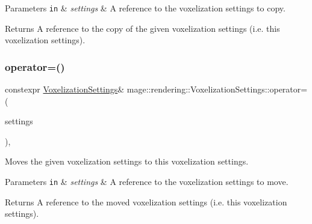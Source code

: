\begin{DoxyParams}[1]{Parameters}
\mbox{\tt in}  & {\em settings} & A reference to the voxelization settings to copy. \\
\hline
\end{DoxyParams}
\begin{DoxyReturn}{Returns}
A reference to the copy of the given voxelization settings (i.\+e. this voxelization settings). 
\end{DoxyReturn}
\mbox{\label{classmage_1_1rendering_1_1_voxelization_settings_a96ea5fa3e2a8bdab0b4835caa11bd13f}} 
\subsubsection{\texorpdfstring{operator=()}{operator=()}\hspace{0.1cm}{\footnotesize\ttfamily [2/2]}}
{\footnotesize\ttfamily constexpr \mbox{\hyperlink{classmage_1_1rendering_1_1_voxelization_settings}{Voxelization\+Settings}}\& mage\+::rendering\+::\+Voxelization\+Settings\+::operator= (\begin{DoxyParamCaption}\item[{\mbox{\hyperlink{classmage_1_1rendering_1_1_voxelization_settings}{Voxelization\+Settings}} \&\&}]{settings }\end{DoxyParamCaption})\hspace{0.3cm}{\ttfamily [default]}, {\ttfamily [noexcept]}}

Moves the given voxelization settings to this voxelization settings.


\begin{DoxyParams}[1]{Parameters}
\mbox{\tt in}  & {\em settings} & A reference to the voxelization settings to move. \\
\hline
\end{DoxyParams}
\begin{DoxyReturn}{Returns}
A reference to the moved voxelization settings (i.\+e. this voxelization settings). 
\end{DoxyReturn}
\mbox{\label{classmage_1_1rendering_1_1_voxelization_settings_a9eafb3795d3e8248196dd7e9c6d32671}} 
